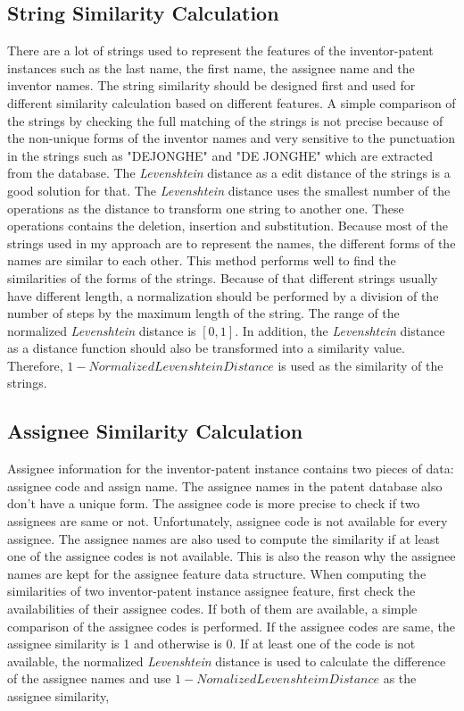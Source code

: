 \subsection{String Similarity Calculation}
There are a lot of strings used to represent the features of the inventor-patent instances such as the last name, the first name, the assignee name and the inventor names. The string similarity should be designed first and used for different similarity calculation based on different features. A simple comparison of the strings by checking the full matching of the strings is not precise because of the non-unique forms of the inventor names and very sensitive to the punctuation in the strings such as "DEJONGHE" and "DE JONGHE" which are extracted from the database. The \emph{Levenshtein} distance as a edit distance of the strings is a good solution for that. The \emph{Levenshtein} distance uses the smallest number of the operations as the distance to transform one string to another one. These operations contains the deletion, insertion and substitution.  Because most of the strings used in my approach are to represent the names, the different forms of the names are similar to each other. This method performs well to find the similarities of the forms of the strings. Because of that different strings usually have different length, a normalization should be performed by a division of the number of steps by the maximum length of the string. The range of the normalized \emph{Levenshtein} distance is $[0,1]$. In addition, the \emph{Levenshtein} distance as a distance function should also be transformed into a similarity value. Therefore, $1-Normalized Levenshtein Distance$ is used as the similarity of the strings. 


\subsection{Assignee Similarity Calculation}
Assignee information for the inventor-patent instance contains two pieces of data: assignee code and assign name. The assignee names in the patent database also don't have a unique form. The assignee code is more precise to check if two assignees are same or not. Unfortunately, assignee code is not available for every assignee. The assignee names are also used to compute the similarity if at least one of the assignee codes is not available. This is also the reason why the assignee names are kept for the assignee feature data structure. When computing the similarities of two inventor-patent instance assignee feature, first check the availabilities of their assignee codes. If both of them are available, a simple comparison of the assignee codes is performed. If the assignee codes are same, the assignee similarity is 1 and otherwise is 0. If at least one of the code is not available, the normalized \emph{Levenshtein} distance is used to calculate the difference of the assignee names and use $1-Nomalized Levenshteim Distance$ as the assignee similarity,


